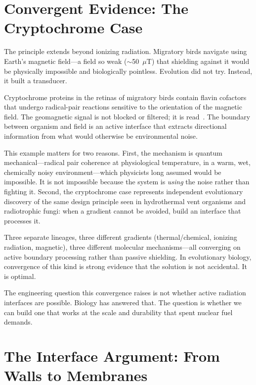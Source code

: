 \documentclass[12pt]{article}
\begin{document}
\section{Convergent Evidence: The Cryptochrome Case}

The principle extends beyond ionizing radiation. Migratory birds navigate using Earth's
magnetic field---a field so weak ($\sim$50~$\mu$T) that shielding against it would be
physically impossible and biologically pointless. Evolution did not try. Instead, it built
a transducer.

Cryptochrome proteins in the retinas of migratory birds contain flavin cofactors that
undergo radical-pair reactions sensitive to the orientation of the magnetic field. The
geomagnetic signal is not blocked or filtered; it is read~\cite{ritz2000,hore2016}. The
boundary between organism and field is an active interface that extracts directional
information from what would otherwise be environmental noise.

This example matters for two reasons. First, the mechanism is quantum mechanical---radical
pair coherence at physiological temperature, in a warm, wet, chemically noisy
environment---which physicists long assumed would be impossible. It is not impossible
because the system is \emph{using} the noise rather than fighting it. Second, the
cryptochrome case represents independent evolutionary discovery of the same design
principle seen in hydrothermal vent organisms and radiotrophic fungi: when a gradient
cannot be avoided, build an interface that processes it.

Three separate lineages, three different gradients (thermal/chemical, ionizing radiation,
magnetic), three different molecular mechanisms---all converging on active boundary
processing rather than passive shielding. In evolutionary biology, convergence of this
kind is strong evidence that the solution is not accidental. It is optimal.

The engineering question this convergence raises is not whether active radiation interfaces
are possible. Biology has answered that. The question is whether we can build one that
works at the scale and durability that spent nuclear fuel demands.

\section{The Interface Argument: From Walls to Membranes}
\end{document}
